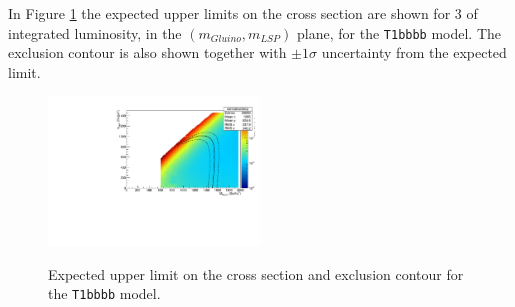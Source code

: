 In Figure \ref{fig:T1bbbb_plane_expected} the expected upper limits on the cross section are shown for 3 \ifb of integrated luminosity, in the $(m_{Gluino},m_{LSP})$ plane, for the \texttt{T1bbbb} model. 
The exclusion contour is also shown together with $\pm1\sigma$ uncertainty from the expected limit. 

\begin{figure}
  \begin{center}
    \includegraphics[width=0.5\textwidth]{figures/susyResults/xs_contour_withHisto-1} \\
    \caption{Expected upper limit on the cross section and exclusion contour for the \texttt{T1bbbb} model.}
    \label{fig:T1bbbb_plane_expected}
  \end{center}
\end{figure}





